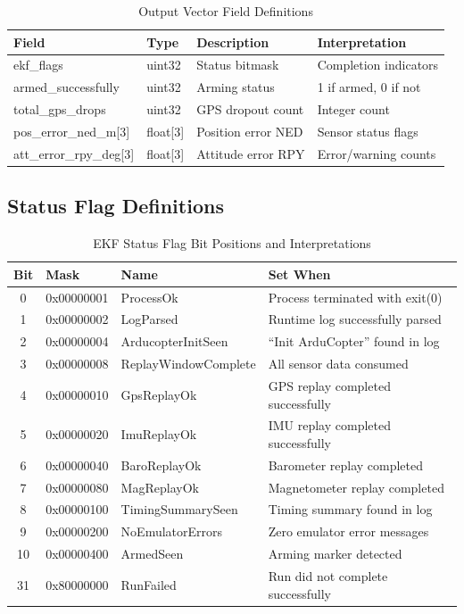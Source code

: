 \documentclass[11pt,a4paper]{article}
\begin{document}
\begin{table}[H]
\centering
\caption{Output Vector Field Definitions}
\label{tab:output_vector}
\begin{tabular}{@{}llp{5cm}l@{}}
\toprule
\textbf{Field} & \textbf{Type} & \textbf{Description} & \textbf{Interpretation} \\
\midrule
ekf\_flags & uint32 & Status bitmask & Completion indicators \\
armed\_successfully & uint32 & Arming status & 1 if armed, 0 if not \\
total\_gps\_drops & uint32 & GPS dropout count & Integer count \\
pos\_error\_ned\_m[3] & float[3] & Position error NED & Sensor status flags \\
att\_error\_rpy\_deg[3] & float[3] & Attitude error RPY & Error/warning counts \\
\bottomrule
\end{tabular}
\end{table}

\subsection{Status Flag Definitions}

\begin{table}[H]
\centering
\caption{EKF Status Flag Bit Positions and Interpretations}
\label{tab:flags}
\begin{tabular}{@{}cllp{5cm}@{}}
\toprule
\textbf{Bit} & \textbf{Mask} & \textbf{Name} & \textbf{Set When} \\
\midrule
0 & 0x00000001 & ProcessOk & Process terminated with exit(0) \\
1 & 0x00000002 & LogParsed & Runtime log successfully parsed \\
2 & 0x00000004 & ArducopterInitSeen & ``Init ArduCopter'' found in log \\
3 & 0x00000008 & ReplayWindowComplete & All sensor data consumed \\
4 & 0x00000010 & GpsReplayOk & GPS replay completed successfully \\
5 & 0x00000020 & ImuReplayOk & IMU replay completed successfully \\
6 & 0x00000040 & BaroReplayOk & Barometer replay completed \\
7 & 0x00000080 & MagReplayOk & Magnetometer replay completed \\
8 & 0x00000100 & TimingSummarySeen & Timing summary found in log \\
9 & 0x00000200 & NoEmulatorErrors & Zero emulator error messages \\
10 & 0x00000400 & ArmedSeen & Arming marker detected \\
31 & 0x80000000 & RunFailed & Run did not complete successfully \\
\bottomrule
\end{tabular}
\end{table}
\end{document}
